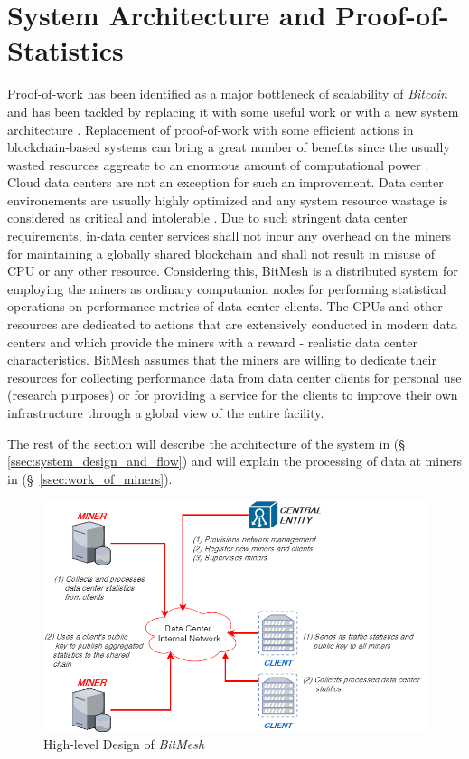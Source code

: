 \documentclass[11px]{article}
\newcommand{\projTitle}{BitMesh\xspace}
\begin{document}
\section{System Architecture and Proof-of-Statistics}
Proof-of-work has been identified as a major bottleneck of scalability of \textit{Bitcoin}  and has been tackled by replacing it with some useful work \cite{filecoin-storage} or with a new system architecture \cite{RSCoin-bank}.  Replacement of proof-of-work with some efficient actions in blockchain-based systems can bring a great number of benefits since the usually wasted resources aggreate to an enormous amount of  computational power \cite{bitcoin-comp-elec-power}. Cloud data centers are not an exception for such an improvement. Data center environements are usually highly optimized and any system resource wastage is considered as critical and intolerable \cite{google-ai-power, facebook-cold-storage-rack}. Due to such stringent data center requirements, in-data center services shall not incur any overhead on the miners for maintaining a globally shared blockchain and shall not result in misuse of CPU or any other resource. Considering this, \projTitle is a distributed system for employing the miners as ordinary computanion nodes for performing statistical operations on performance metrics of data center clients. The CPUs and other resources are dedicated to actions that are extensively conducted in modern data centers \cite{microsoft-autopilot} and which provide the miners with a reward - realistic data center characteristics. \projTitle assumes that the miners are willing to dedicate their resources for collecting performance data from data center clients for personal use (research purposes) or for providing a service for the clients to improve their own infrastructure through a global view of the entire facility.

The rest of the section will describe the architecture of the system in (\S~ \ref{ssec:system_design_and_flow}) and will explain
the processing of data at miners in (\S~\ref{ssec:work_of_miners}).

\begin{figure}[h!]
  \begin{center}
    \includegraphics[width=0.8\linewidth]{figures/project_design.png}
    \caption{High-level Design of \textit{\projTitle}}
    \label{fig:project_design}
  \end{center}
\end{figure}
\end{document}
